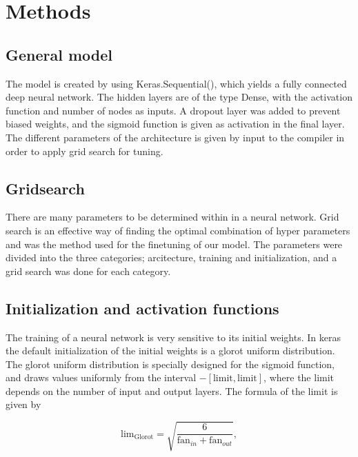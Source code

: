 \documentclass[prl,twocolumn]{revtex4-1}
\begin{document}

 \section{Methods}
\subsection{}


\subsection{General model}
The model is created by using Keras.Sequential(), which yields a fully connected deep neural network. The hidden layers are of the type Dense, with the activation function and number of nodes as inputs. A dropout layer was added to prevent biased weights, and the sigmoid function is given as activation in the final layer. The different parameters of the architecture is given by input to the compiler in order to apply grid search for tuning.

\subsection{Gridsearch}
There are many parameters to be determined within in a neural network. Grid search is an effective way of finding the optimal combination of hyper parameters and was the method used for the finetuning of our model. The parameters were divided into the three categories; arcitecture, training and initialization, and a grid search was done for each category.


\subsection{Initialization and activation functions}
The training of a neural network is very sensitive to its initial weights. In keras the default initialization of the initial weights is a glorot uniform distribution. The glorot uniform distribution is specially designed for the sigmoid function, and draws values uniformly from the interval $-[\textrm{limit},\textrm{limit}]$, where the limit depends on the number of input and output layers. The formula of the limit is given by 

\begin{equation}
    \textrm{lim}_\textrm{Glorot} = \sqrt{\frac{6}{\textrm{fan}_{in}+\textrm{fan}_{out}}},
\end{equation}
\end{document}
